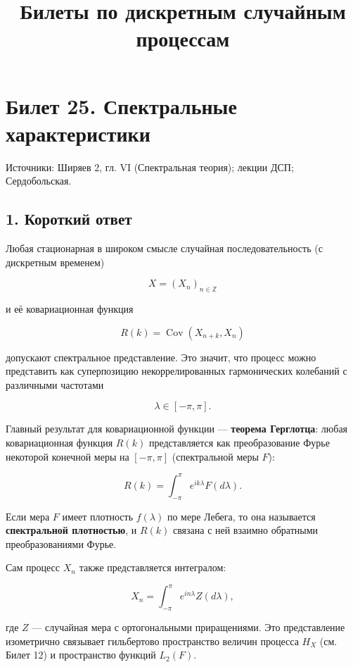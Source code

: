 \documentclass[
  11pt,
  a4paper,
]{article}
\title{Билеты по дискретным случайным процессам}
\author{}
\date{}
\begin{document}
\maketitle

\section{Билет 25. Спектральные
характеристики}\label{ux431ux438ux43bux435ux442-25.-ux441ux43fux435ux43aux442ux440ux430ux43bux44cux43dux44bux435-ux445ux430ux440ux430ux43aux442ux435ux440ux438ux441ux442ux438ux43aux438}

Источники: Ширяев 2, гл. VI (Спектральная теория); лекции ДСП;
Сердобольская.

\subsection{1. Короткий
ответ}\label{ux43aux43eux440ux43eux442ux43aux438ux439-ux43eux442ux432ux435ux442}

Любая стационарная в широком смысле случайная последовательность (с
дискретным временем)

\[
X = (X_n)_{n \in \mathbb{Z}}
\]

и её ковариационная функция

\[
R(k) = \operatorname{Cov}(X_{n+k}, X_n)
\]

допускают спектральное представление. Это значит, что процесс можно
представить как суперпозицию некоррелированных гармонических колебаний с
различными частотами

\[
\lambda \in [-\pi, \pi].
\]

Главный результат для ковариационной функции --- \textbf{теорема
Герглотца}: любая ковариационная функция \(R(k)\) представляется как
преобразование Фурье некоторой конечной меры на \([-\pi, \pi]\)
(спектральной меры \(F\)):

\[
R(k) = \int_{-\pi}^{\pi} e^{i k \lambda} F(d\lambda).
\]

Если мера \(F\) имеет плотность \(f(\lambda)\) по мере Лебега, то она
называется \textbf{спектральной плотностью}, и \(R(k)\) связана с ней
взаимно обратными преобразованиями Фурье.

Сам процесс \(X_n\) также представляется интегралом:

\[
X_n = \int_{-\pi}^{\pi} e^{i n \lambda} Z(d\lambda),
\]

где \(Z\) --- случайная мера с ортогональными приращениями. Это
представление изометрично связывает гильбертово пространство величин
процесса \(H_X\) (см. Билет 12) и пространство функций \(L_2(F)\).
\end{document}
